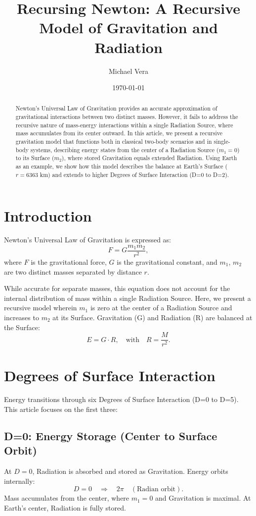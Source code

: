 \documentclass[12pt]{article}
\title{Recursing Newton: A Recursive Model of Gravitation and Radiation}
\author{Michael Vera}
\date{\today}
\begin{document}
\maketitle

\begin{abstract}
Newton's Universal Law of Gravitation provides an accurate approximation of gravitational interactions between two distinct masses. However, it fails to address the recursive nature of mass-energy interactions within a single Radiation Source, where mass accumulates from its center outward. In this article, we present a recursive gravitation model that functions both in classical two-body scenarios and in single-body systems, describing energy states from the center of a Radiation Source ($m_1 = 0$) to its Surface ($m_2$), where stored Gravitation equals extended Radiation. Using Earth as an example, we show how this model describes the balance at Earth's Surface ($r = 6363$ km) and extends to higher Degrees of Surface Interaction (D=0 to D=2).
\end{abstract}

\section{Introduction}
Newton’s Universal Law of Gravitation is expressed as:
\[
F = G \frac{m_1 m_2}{r^2},
\]
where $F$ is the gravitational force, $G$ is the gravitational constant, and $m_1$, $m_2$ are two distinct masses separated by distance $r$.

While accurate for separate masses, this equation does not account for the internal distribution of mass within a single Radiation Source. Here, we present a recursive model wherein $m_1$ is zero at the center of a Radiation Source and increases to $m_2$ at its Surface. Gravitation (G) and Radiation (R) are balanced at the Surface:
\[
E = G \cdot R, \quad \text{with} \quad R = \frac{M}{r^2}.
\]

\section{Degrees of Surface Interaction}
Energy transitions through six Degrees of Surface Interaction (D=0 to D=5). This article focuses on the first three:

\subsection{D=0: Energy Storage (Center to Surface Orbit)}
At $D=0$, Radiation is absorbed and stored as Gravitation. Energy orbits internally:
\[
D=0 \quad \Rightarrow \quad 2\pi \quad (\text{Radian orbit}).
\]
Mass accumulates from the center, where $m_1=0$ and Gravitation is maximal. At Earth’s center, Radiation is fully stored.
\end{document}
